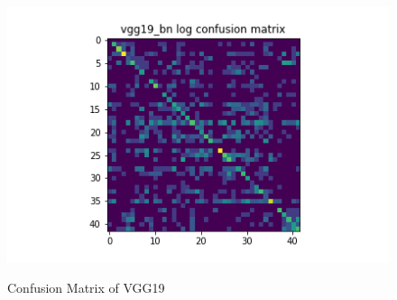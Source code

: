 \begin{figure}[H]
\begin{minipage}[b]{.5\linewidth}
  \end{minipage}
  \hfill
  \begin{minipage}[b]{.5\linewidth}
    \centering
    {\includegraphics[width=1.2\textwidth]{figs/conf_matrix/vgg19_bn_log_conf.png}}
  \end{minipage}

  \caption{Confusion Matrix of VGG19}
  \label{fig:vgg19_conf}
  \vspace{0.2in}
\end{figure}

